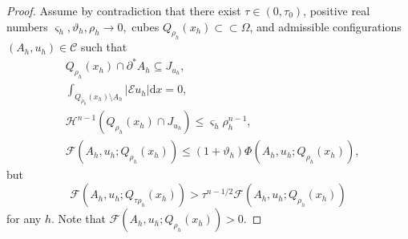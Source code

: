 \documentclass[reqno]{amsart}
\numberwithin{equation}{section}
\theoremstyle{plain}
\theoremstyle{definition}
\newcommand{\cH}{\mathcal{H}}
\newcommand{\cF}{\mathcal{F}}
\newcommand{\p}{\partial}
\renewcommand{\d}{\mathrm{d}}
\newcommand{\strictlyincluded}{\subset\subset}
\newcommand{\str}[1]{\mathcal{E}#1}
\newcommand{\admissible}{\mathcal{C}}
\begin{document}
\begin{proof}
 Assume by contradiction that there exist $\tau\in(0,\tau_0)$, positive real numbers $\varsigma_h,\vartheta_h,\rho_h\to0,$ cubes $Q_{\rho_h}(x_h)\strictlyincluded \Omega$, and admissible configurations $(A_h,u_h)\in \admissible$ such that
 \begin{subequations}
\begin{align}
& Q_{\rho_h}(x_h)\cap \p^*A_h\subseteq J_{u_h},  \label{cntr_a0}\\
& \int_{Q_{\rho_h}(x_h)\setminus A_h} |\str{u_h}|\d x=0,\\
& \cH^{n-1} (Q_{\rho_h}(x_h)\cap J_{u_h}) \le \varsigma_h \rho_h^{n-1}, \\
& \cF(A_h,u_h;Q_{\rho_h}(x_h)) \le (1 + \vartheta_h)\Phi(A_h,u_h;Q_{\rho_h}(x_h)), \label{cntr_a1} 
\end{align}
\end{subequations}
%
but 
\begin{equation}
\cF(A_h,u_h;Q_{\tau\rho_h}(x_h))>\tau^{n-1/2} \cF(A_h,u_h;Q_{\rho_h}(x_h))  \label{contradiction_ass3} 
\end{equation}
for any $h.$ Note that $\cF(A_h,u_h;Q_{\rho_h}(x_h))>0.$


\end{proof}
\end{document}
